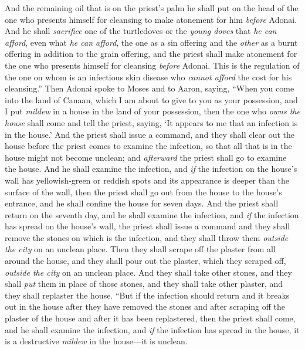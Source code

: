 \begin{biblechapter}
\verse And the remaining oil that is on the priest’s palm he shall put on the head of the one who presents himself for cleansing to make atonement for him \textit{before} Adonai.
\verse And he shall \textit{sacrifice} one of the turtledoves or the \textit{young doves} that \textit{he can afford},
\verse even what \textit{he can afford}, the one as a sin offering and the \textit{other} as a burnt offering in addition to the grain offering, and the priest shall make atonement for the one who presents himself for cleansing \textit{before} Adonai.
\verse This is the regulation of the one on whom is an infectious skin disease who \textit{cannot afford} the cost for his cleansing.”
 Then Adonai spoke to Moses and to Aaron, saying,
\verse “When you come into the land of Canaan, which I am about to give to you as your possession, and I put \textit{mildew} in a house in the land of your possession,
\verse then the one who \textit{owns the house} shall come and tell the priest, saying, ‘It appears to me that an infection is in the house.’
\verse And the priest shall issue a command, and they shall clear out the house before the priest comes to examine the infection, so that all that is in the house might not become unclean; and \textit{afterward} the priest shall go to examine the house.
\verse And he shall examine the infection, and \textit{if} the infection on the house’s wall has yellowish-green or reddish spots and its appearance is deeper than the surface of the wall,
\verse then the priest shall go out from the house to the house’s entrance, and he shall confine the house for seven days.
\verse And the priest shall return on the seventh day, and he shall examine the infection, and \textit{if} the infection has spread on the house’s wall,
\verse the priest shall issue a command and they shall remove the stones on which is the infection, and they shall throw them \textit{outside the city} on an unclean place.
\verse Then they shall scrape off the plaster from all around the house, and they shall pour out the plaster, which they scraped off, \textit{outside the city} on an unclean place.
\verse And they shall take other stones, and they shall \textit{put} them in place of those stones, and they shall take other plaster, and they shall replaster the house.
\verse “But if the infection should return and it breaks out in the house after they have removed the stones and after scraping off the plaster of the house and after it has been replastered,
\verse then the priest shall come, and he shall examine the infection, and \textit{if} the infection has spread in the house, it is a destructive \textit{mildew} in the house—it is unclean.

\end{biblechapter}
